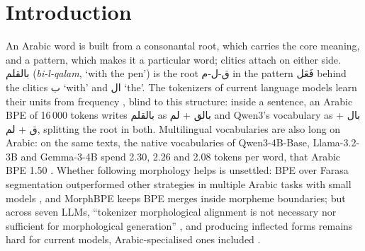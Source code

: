 \providecommand{\tok}[2]{\texttt{[#1\_}\textarabic{#2}\texttt{]}}

\section{Introduction}
\label{sec:intro}

An Arabic word is built from a consonantal root, which carries the core meaning, and a pattern, which makes it a
particular word; clitics attach on either side. \textarabic{بالقلم} (\textit{bi-l-qalam}, `with the pen') is the root
\textarabic{ق-ل-م} in the pattern \textarabic{فَعَل} behind the clitics \textarabic{ب} `with' and \textarabic{ال} `the'.
The tokenizers of current language models learn their units from frequency
\citep{sennrich-etal-2016-neural,kudo-richardson-2018-sentencepiece}, blind to this structure: inside a sentence, an
Arabic BPE of 16\,000 tokens writes \textarabic{بالقلم} as \textarabic{بالق} + \textarabic{لم} and Qwen3's vocabulary
as \textarabic{بال} + \textarabic{ق} + \textarabic{لم}, splitting the root in both. Multilingual vocabularies are also
long on Arabic: on the same texts, the native vocabularies of Qwen3-4B-Base, Llama-3.2-3B and Gemma-3-4B spend 2.30,
2.26 and 2.08 tokens per word, that Arabic BPE 1.50 \citep[fertility;][]{rust-etal-2021-good}. Whether following
morphology helps is unsettled: BPE over Farasa segmentation outperformed other strategies in multiple Arabic tasks with
small models \citep{alrefaie2024exploring}, and MorphBPE \citep{asgari2025morphbpe} keeps BPE merges inside morpheme
boundaries; but across seven LLMs, ``tokenizer morphological alignment is not necessary nor sufficient for
morphological generation'' \citep{alakeel2026morphemes}, and producing inflected forms remains hard for current models,
Arabic-specialised ones included \citep{reda2026yallamorph}.

